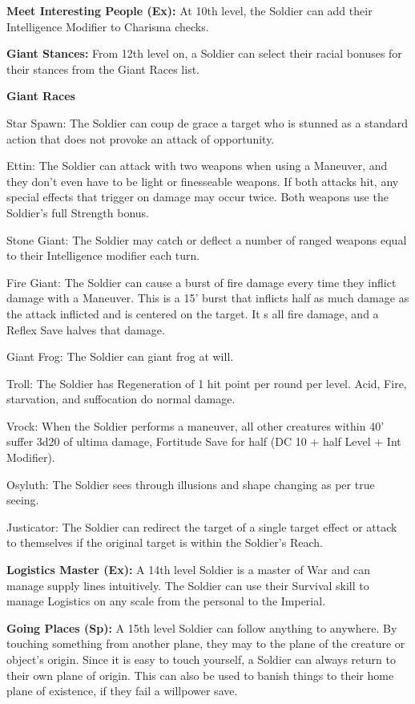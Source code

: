 \textbf{Meet Interesting People (Ex):} At 10th level, the Soldier can add their Intelligence Modifier to Charisma checks.

\textbf{Giant Stances:} From 12th level on, a Soldier can select their racial bonuses for their stances from the Giant Races list.

\textbf{Giant Races}
\begin{description*}
\item[Star Spawn:] The Soldier can coup de grace a target who is stunned as a standard action that does not provoke an attack of opportunity.
\item[Ettin:] The Soldier can attack with two weapons when using a Maneuver, and they don't even have to be light or finesseable weapons. If both attacks hit, any special effects that trigger on damage may occur twice. Both weapons use the Soldier's full Strength bonus.
\item[Stone Giant:] The Soldier may catch or deflect a number of ranged weapons equal to their Intelligence modifier each turn.
\item[Fire Giant:] The Soldier can cause a burst of fire damage every time they inflict damage with a Maneuver. This is a 15' burst that inflicts half as much damage as the attack inflicted and is centered on the target. It s all fire damage, and a Reflex Save halves that damage.
\item[Giant Frog:] The Soldier can giant frog at will.
\item[Troll:] The Soldier has Regeneration of 1 hit point per round per level. Acid, Fire, starvation, and suffocation do normal damage.
\item[Vrock:] When the Soldier performs a maneuver, all other creatures within 40' suffer 3d20 of ultima damage, Fortitude Save for half (DC 10 + half Level + Int Modifier).
\item[Osyluth:] The Soldier sees through illusions and shape changing as per true seeing.
\item[Justicator:] The Soldier can redirect the target of a single target effect or attack to themselves if the original target is within the Soldier's Reach.
\end{description*}

\textbf{Logistics Master (Ex):} A 14th level Soldier is a master of War and can manage supply lines intuitively. The Soldier can use their Survival skill to manage Logistics on any scale from the personal to the Imperial.

\textbf{Going Places (Sp):} A 15th level Soldier can follow anything to anywhere. By touching something from another plane, they may  to the plane of the creature or object's origin. Since it is easy to touch yourself, a Soldier can always return to their own plane of origin. This can also be used to banish things to their home plane of existence, if they fail a willpower save.

